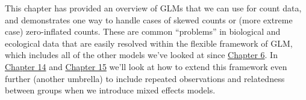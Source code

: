 \documentclass[
]{book}
\begin{document}
This chapter has provided an overview of GLMs that we can use for count data, and demonstrates one way to handle cases of skewed counts or (more extreme case) zero-inflated counts. These are common ``problems'' in biological and ecological data that are easily resolved within the flexible framework of GLM, which includes all of the other models we've looked at since \protect\hyperlink{Chapter6}{Chapter 6}. In \protect\hyperlink{Chapter14}{Chapter 14} and \protect\hyperlink{Chapter15}{Chapter 15} we'll look at how to extend this framework even further (another umbrella) to include repeated observations and relatedness between groups when we introduce mixed effects models.

  
\end{document}
